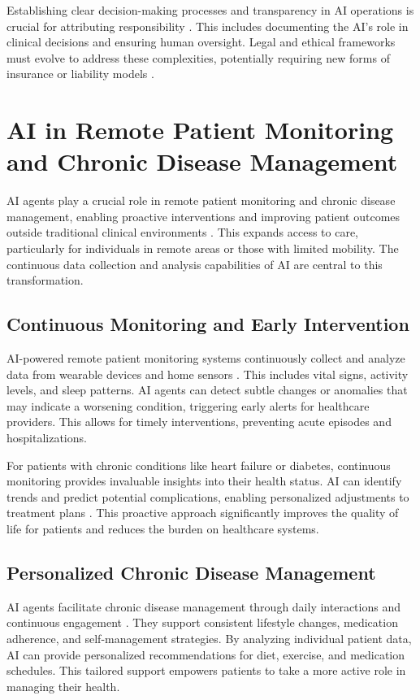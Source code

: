 \documentclass[12pt,a4paper]{article}
\begin{document}
Establishing clear decision-making processes and transparency in AI operations is crucial for attributing responsibility \cite{alation_data_catalog}. This includes documenting the AI's role in clinical decisions and ensuring human oversight. Legal and ethical frameworks must evolve to address these complexities, potentially requiring new forms of insurance or liability models \cite{reedsmith}.

\section{AI in Remote Patient Monitoring and Chronic Disease Management}
AI agents play a crucial role in remote patient monitoring and chronic disease management, enabling proactive interventions and improving patient outcomes outside traditional clinical environments \cite{emerline.com}. This expands access to care, particularly for individuals in remote areas or those with limited mobility. The continuous data collection and analysis capabilities of AI are central to this transformation.

\subsection{Continuous Monitoring and Early Intervention}
AI-powered remote patient monitoring systems continuously collect and analyze data from wearable devices and home sensors \cite{medium.com}. This includes vital signs, activity levels, and sleep patterns. AI agents can detect subtle changes or anomalies that may indicate a worsening condition, triggering early alerts for healthcare providers. This allows for timely interventions, preventing acute episodes and hospitalizations.

For patients with chronic conditions like heart failure or diabetes, continuous monitoring provides invaluable insights into their health status. AI can identify trends and predict potential complications, enabling personalized adjustments to treatment plans \cite{ibm_watson_health}. This proactive approach significantly improves the quality of life for patients and reduces the burden on healthcare systems.

\subsection{Personalized Chronic Disease Management}
AI agents facilitate chronic disease management through daily interactions and continuous engagement \cite{emerline.com}. They support consistent lifestyle changes, medication adherence, and self-management strategies. By analyzing individual patient data, AI can provide personalized recommendations for diet, exercise, and medication schedules. This tailored support empowers patients to take a more active role in managing their health.
\end{document}
